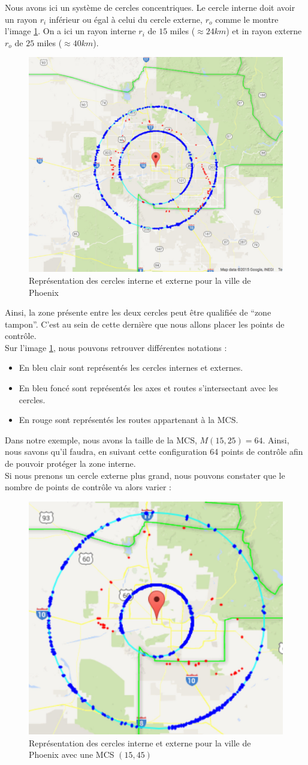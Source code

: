 Nous avons ici un système de cercles concentriques. Le cercle interne doit avoir un rayon $r_i$ inférieur ou égal à celui du cercle externe, $r_o$ comme le montre l'image \ref{img:1}. On a ici un rayon interne $r_i$ de $15$ miles ($\approx 24km$) et in rayon externe $r_o$ de $25$ miles ($\approx 40km$).
\begin{figure}[H]
 \centering
 \includegraphics[width=.5\textwidth]{img/circles.png}
 \caption{Représentation des cercles interne et externe pour la ville de Phoenix}
 \label{img:1}
\end{figure}
Ainsi, la zone présente entre les deux cercles peut être qualifiée de \enquote{zone tampon}. C'est au sein de cette dernière que nous allons placer les points de contrôle.\\
Sur l'image \ref{img:1}, nous pouvons retrouver différentes notations :
\begin{itemize}
 \item En bleu clair sont représentés les cercles internes et externes.
 \item En bleu foncé sont représentés les axes et routes s'intersectant avec les cercles.
 \item En rouge sont représentés les routes appartenant à la MCS.
\end{itemize}
Dans notre exemple, nous avons la taille de la MCS, $M(15,25)=64$. Ainsi, nous savons qu'il faudra, en suivant cette configuration 64 points de contrôle afin de pouvoir protéger la zone interne.\\
Si nous prenons un cercle externe plus grand, nous pouvons constater que le nombre de points de contrôle va alors varier :
\begin{figure}[H]
 \centering
 \includegraphics[width=.5\textwidth]{img/circles2.png}
 \caption{Représentation des cercles interne et externe pour la ville de Phoenix avec une MCS $(15,45)$}
 \label{img:2}
\end{figure}
